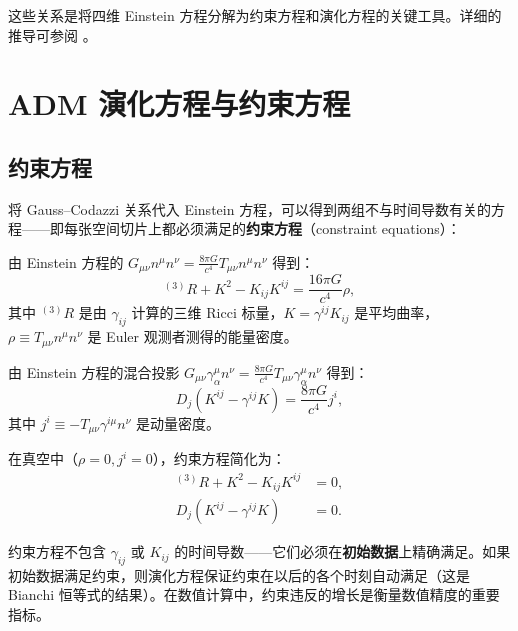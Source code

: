 这些关系是将四维 Einstein 方程分解为约束方程和演化方程的关键工具。详细的推导可参阅 \cite{Gourgoulhon2007,Wald1984}。

\section{ADM 演化方程与约束方程}
\label{sec:ADM_evolution_constraints}

\subsection{约束方程}

将 Gauss--Codazzi 关系代入 Einstein 方程，可以得到两组不与时间导数有关的方程——即每张空间切片上都必须满足的\textbf{约束方程}（constraint equations）：

\begin{theorem}
由 Einstein 方程的 $G_{\mu\nu}n^\mu n^\nu = \frac{8\pi G}{c^4} T_{\mu\nu}n^\mu n^\nu$ 得到：
\begin{equation}
    \boxed{{}^{(3)}\!R + K^2 - K_{ij}K^{ij} = \frac{16\pi G}{c^4} \rho},
    \label{eq:Hamiltonian_constraint}
\end{equation}
其中 ${}^{(3)}\!R$ 是由 $\gamma_{ij}$ 计算的三维 Ricci 标量，$K = \gamma^{ij}K_{ij}$ 是平均曲率，$\rho \equiv T_{\mu\nu}n^\mu n^\nu$ 是 Euler 观测者测得的能量密度。
\label{thm:Hamiltonian_constraint}
\end{theorem}

\begin{theorem}[动量约束方程]
由 Einstein 方程的混合投影 $G_{\mu\nu}\gamma^\mu_\alpha n^\nu = \frac{8\pi G}{c^4} T_{\mu\nu}\gamma^\mu_\alpha n^\nu$ 得到：
\begin{equation}
    \boxed{D_j(K^{ij} - \gamma^{ij}K) = \frac{8\pi G}{c^4} j^i},
    \label{eq:momentum_constraint}
\end{equation}
其中 $j^i \equiv -T_{\mu\nu}\gamma^{i\mu}n^\nu$ 是动量密度。
\label{thm:momentum_constraint}
\end{theorem}

在真空中（$\rho=0, j^i=0$），约束方程简化为：
\begin{align}
    {}^{(3)}\!R + K^2 - K_{ij}K^{ij} &= 0, \label{eq:vacuum_Hamiltonian} \\
    D_j(K^{ij} - \gamma^{ij}K) &= 0. \label{eq:vacuum_momentum}
\end{align}

\begin{note}[约束方程的角色]
    约束方程不包含 $\gamma_{ij}$ 或 $K_{ij}$ 的时间导数——它们必须在\textbf{初始数据}上精确满足。如果初始数据满足约束，则演化方程保证约束在以后的各个时刻自动满足（这是 Bianchi 恒等式的结果）。在数值计算中，约束违反的增长是衡量数值精度的重要指标。
\end{note}


